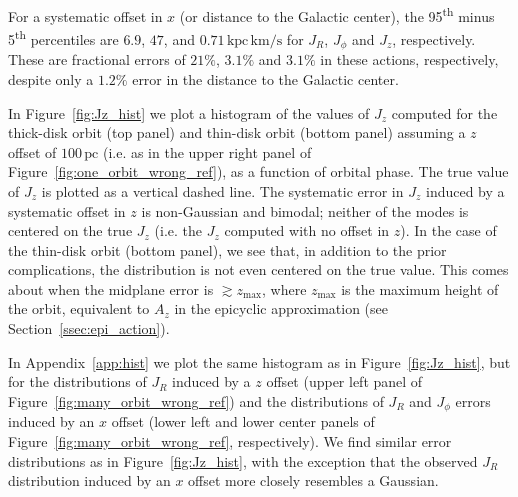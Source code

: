 \documentclass[twocolumn]{aastex62}
\newcommand{\pc}{\text{pc}}
\newcommand{\kms}{\text{km}/\text{s}}
\newcommand{\actunit}{\text{kpc}\,\kms}
\begin{document}
For a systematic offset in $x$ (or distance to the Galactic center), the
95\textsuperscript{th} minus 5\textsuperscript{th} percentiles are $6.9$,
$47$, and $0.71\,\actunit$ for $J_R$, $J_{\phi}$ and $J_z$, respectively.
These are fractional errors of $21\%$, $3.1\%$ and $3.1\%$ in these actions, respectively, despite only a $1.2\%$ error in the distance to the Galactic center.

In Figure~\ref{fig:Jz_hist} we plot a histogram of the values of
$J_z$ computed for the thick-disk orbit (top panel) and thin-disk orbit (bottom panel)
assuming a $z$ offset of $100\,\pc$ (i.e. as in the upper right panel of
Figure~\ref{fig:one_orbit_wrong_ref}), as a function of orbital phase. The true value of $J_z$ is plotted as a
vertical dashed line. The systematic error in $J_z$ induced by a
systematic offset in $z$ is non-Gaussian and bimodal; neither of the modes is centered on the true $J_z$ (i.e. the $J_z$ computed with no offset in $z$). In the case of the thin-disk orbit
(bottom panel), we see that, in addition to the prior complications, the
distribution is not even centered on the true value. This comes about when the midplane
error is $\gtrsim z_{\text{max}}$, where $z_{\text{max}}$ is the maximum
height of the orbit, equivalent to $A_z$ in the epicyclic approximation (see
Section~\ref{ssec:epi_action}).

In Appendix~\ref{app:hist} we plot the same histogram as in
Figure~\ref{fig:Jz_hist}, but for the distributions of $J_R$ induced
by a $z$ offset (upper left panel of Figure~\ref{fig:many_orbit_wrong_ref})
and the distributions of $J_R$ and $J_{\phi}$ errors induced by an
$x$ offset (lower left and lower center panels of
Figure~\ref{fig:many_orbit_wrong_ref}, respectively). We find similar error
distributions as in Figure~\ref{fig:Jz_hist}, with the exception that the
observed $J_R$ distribution induced by an $x$ offset more closely resembles a
Gaussian.
\end{document}
